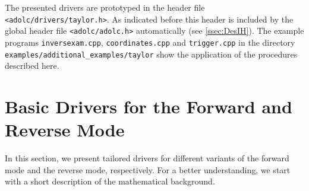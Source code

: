 \documentclass[11pt,twoside]{article}
\begin{document}
The presented drivers are prototyped in the header file 
\verb=<adolc/drivers/taylor.h>=. As indicated before this header
is included by the global header file \verb=<adolc/adolc.h>= automatically
(see \autoref{ssec:DesIH}). 
The example programs \verb=inversexam.cpp=, \verb=coordinates.cpp= and 
\verb=trigger.cpp=  in the directory \verb=examples/additional_examples/taylor= 
show the application of the procedures described here.
%
%
\section{Basic Drivers for the Forward and Reverse Mode}
\label{forw_rev_ad}
%
In this section, we present tailored drivers for different
variants of the forward mode and the reverse mode, respectively.
For a better understanding, we start with a short 
description of the mathematical background.
\end{document}
